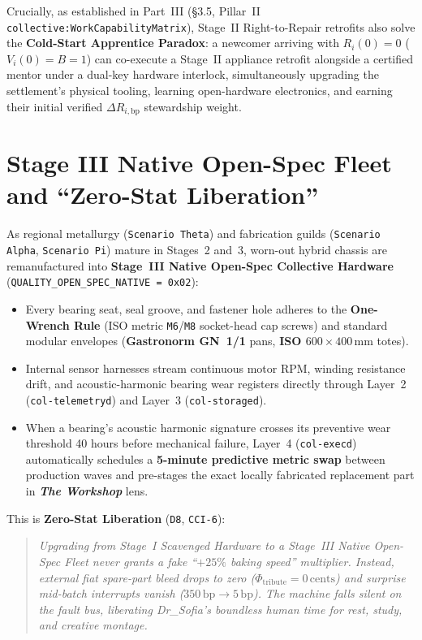 Crucially, as established in Part~III (\S 3.5, Pillar~II \texttt{collective:WorkCapabilityMatrix}), Stage~II Right-to-Repair retrofits also solve the \textbf{Cold-Start Apprentice Paradox}: a newcomer arriving with $R_i(0) = 0$ ($V_i(0) = B = 1$) can co-execute a Stage~II appliance retrofit alongside a certified mentor under a dual-key hardware interlock, simultaneously upgrading the settlement's physical tooling, learning open-hardware electronics, and earning their initial verified $\Delta R_{i,\mathrm{bp}}$ stewardship weight.

\section{Stage III Native Open-Spec Fleet and ``Zero-Stat Liberation''}
\label{sec:l7-stage3-zero-stat}

As regional metallurgy (\texttt{Scenario Theta}) and fabrication guilds (\texttt{Scenario Alpha}, \texttt{Scenario Pi}) mature in Stages~2 and~3, worn-out hybrid chassis are remanufactured into \textbf{Stage~III Native Open-Spec Collective Hardware} (\texttt{QUALITY\_OPEN\_SPEC\_NATIVE = 0x02}):
\begin{itemize}
    \item Every bearing seat, seal groove, and fastener hole adheres to the \textbf{One-Wrench Rule} (ISO metric \texttt{M6}/\texttt{M8} socket-head cap screws) and standard modular envelopes (\textbf{Gastronorm GN~1/1} pans, \textbf{ISO $600 \times 400\,\mathrm{mm}$} totes).
    \item Internal sensor harnesses stream continuous motor RPM, winding resistance drift, and acoustic-harmonic bearing wear registers directly through Layer~2 (\texttt{col-telemetryd}) and Layer~3 (\texttt{col-storaged}).
    \item When a bearing's acoustic harmonic signature crosses its preventive wear threshold 40 hours before mechanical failure, Layer~4 (\texttt{col-execd}) automatically schedules a \textbf{5-minute predictive metric swap} between production waves and pre-stages the exact locally fabricated replacement part in \textbf{\textit{The Workshop}} lens.
\end{itemize}

This is \textbf{Zero-Stat Liberation} (\texttt{D8}, \texttt{CCI-6}):
\begin{quote}
\textit{Upgrading from Stage~I Scavenged Hardware to a Stage~III Native Open-Spec Fleet never grants a fake ``$+25\%$ baking speed'' multiplier. Instead, external fiat spare-part bleed drops to zero ($\Phi_{\mathrm{tribute}} = 0\,\text{cents}$) and surprise mid-batch interrupts vanish ($350\,\mathrm{bp} \to 5\,\mathrm{bp}$). The machine falls silent on the fault bus, liberating Dr\_Sofia's boundless human time for rest, study, and creative montage.}
\end{quote}

